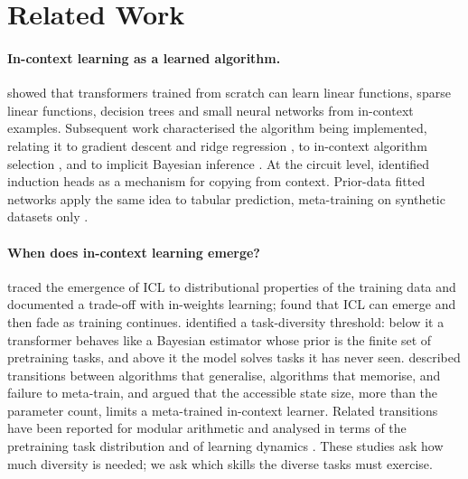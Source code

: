 \documentclass[11pt]{article}
\begin{document}
\section{Related Work}

\paragraph{In-context learning as a learned algorithm.}
\citet{garg2022what} showed that transformers trained from scratch can learn linear functions, sparse linear functions, decision trees and small neural networks from in-context examples.
Subsequent work characterised the algorithm being implemented, relating it to gradient descent and ridge regression \citep{akyurek2023what,vonoswald2023gd}, to in-context algorithm selection \citep{bai2023statisticians}, and to implicit Bayesian inference \citep{xie2022bayesian}.
At the circuit level, \citet{olsson2022induction} identified induction heads as a mechanism for copying from context.
Prior-data fitted networks apply the same idea to tabular prediction, meta-training on synthetic datasets only \citep{muller2022pfn,hollmann2023tabpfn}.

\paragraph{When does in-context learning emerge?}
\citet{chan2022data} traced the emergence of ICL to distributional properties of the training data and documented a trade-off with in-weights learning; \citet{singh2023transient} found that ICL can emerge and then fade as training continues.
\citet{raventos2023diversity} identified a task-diversity threshold: below it a transformer behaves like a Bayesian estimator whose prior is the finite set of pretraining tasks, and above it the model solves tasks it has never seen.
\citet{kirsch2022gpicl} described transitions between algorithms that generalise, algorithms that memorise, and failure to meta-train, and argued that the accessible state size, more than the parameter count, limits a meta-trained in-context learner.
Related transitions have been reported for modular arithmetic \citep{he2024grok} and analysed in terms of the pretraining task distribution \citep{goddard2025when,letey2025alignment} and of learning dynamics \citep{reddy2023mechanistic,nguyen2025kinetics}.
These studies ask how much diversity is needed; we ask which skills the diverse tasks must exercise.
\end{document}
